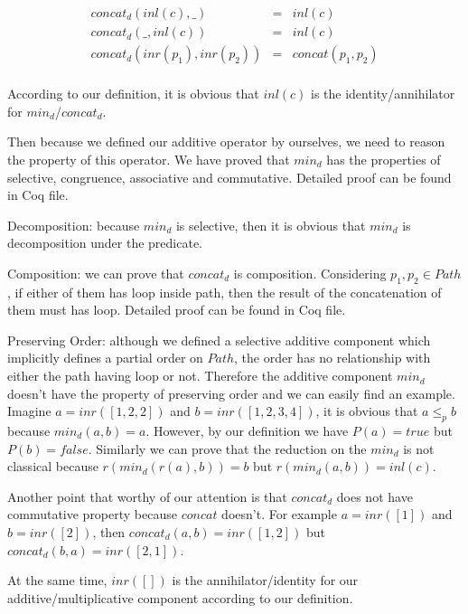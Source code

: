 \documentclass[a4paper,10pt]{article}
\newcommand{\e}[2]{
\begin{equation}
  \label{#1} 
  #2
\end{equation}
}
\begin{document}
\e{pf:def:elementary_path_concat_d}{
\begin{array}{rcl}
concat_d(inl(c),\_)	 & = & inl(c) \\
concat_d(\_,inl(c))	 & = & inl(c) \\
concat_d(inr(p_1),inr(p_2))	 & = & concat(p_1,p_2)\\
\end{array}
}

According to our definition, it is obvious that $inl(c)$ is the identity/annihilator for $min_d$/$concat_d$.

Then because we defined our additive operator by ourselves, we need to reason the property of this operator. We have proved that $min_d$ has the properties of selective, congruence, associative and commutative. Detailed proof can be found in Coq file.

Decomposition: because $min_d$ is selective, then it is obvious that $min_d$ is decomposition under the predicate.

Composition: we can prove that $concat_d$ is composition. Considering $p_1,p_2 \in Path$, if either of them has loop inside path, then the result of the concatenation of them must has loop. Detailed proof can be found in Coq file.

Preserving Order: although we defined a selective additive component which implicitly defines a partial order on $Path$, the order has no relationship with either the path having loop or not. Therefore the additive component $min_d$ doesn't have the property of preserving order and we can easily find an example. Imagine $a = inr([1,2,2])$ and $b = inr([1,2,3,4])$, it is obvious that $a \leq_p b$ because $min_d(a,b) = a$. However, by our definition we have $P(a) = true$ but $P(b) = false$. Similarly we can prove that the reduction on the $min_d$ is not classical because $r(min_d(r(a),b)) = b$ but $r(min_d(a,b)) = inl(c)$.



Another point that worthy of our attention is that $concat_d$ does not have commutative property because $concat$ doesn't. For example $a = inr([1])$ and $b = inr([2])$, then $concat_d(a,b) = inr([1,2])$ but $concat_d(b,a) = inr([2,1])$.

At the same time, $inr([])$ is the annihilator/identity for our additive/multiplicative component according to our definition.
\end{document}
